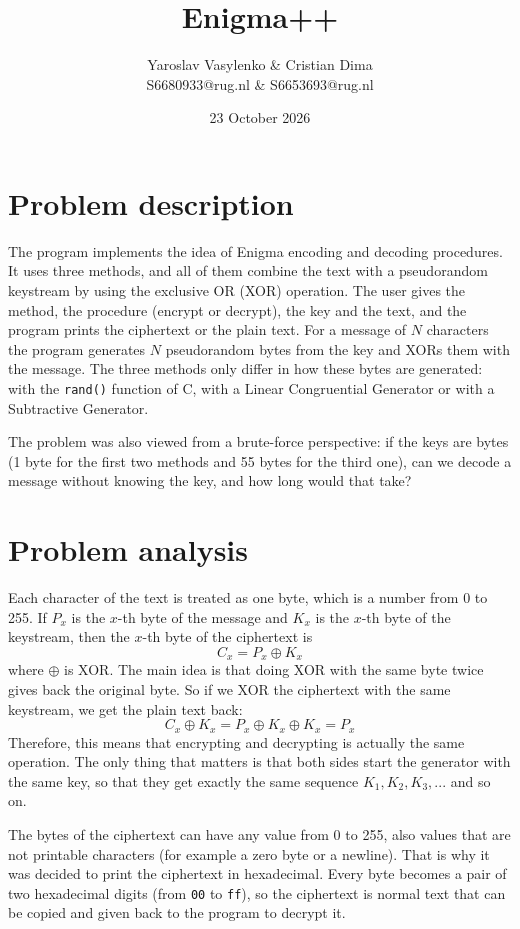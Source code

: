 \documentclass[a4paper,10pt]{article}
\title{Enigma++}
\author{Yaroslav Vasylenko \& Cristian Dima\\
        S6680933@rug.nl \& S6653693@rug.nl}
\date{23 October 2026}
\begin{document}
\maketitle
 
\section{Problem description}
The program implements the idea of Enigma encoding and decoding procedures. It uses three methods, and all of them combine the text with a pseudorandom keystream by using the exclusive OR (XOR) operation.
The user gives the method, the procedure (encrypt or decrypt), the key and the text, and the program prints the ciphertext or the plain text.
For a message of $N$ characters the program generates $N$ pseudorandom bytes from the key and XORs them with the message.
The three methods only differ in how these bytes are generated: with the {\tt rand()} function of C, with a Linear Congruential Generator or with a Subtractive Generator.
 
The problem was also viewed from a brute-force perspective: if the keys are bytes (1 byte for the first two methods and 55 bytes for the third one), can we decode a message without knowing the key, and how long would that take?
 
\section{Problem analysis}
Each character of the text is treated as one byte, which is a number from 0 to 255.
If $P_x$ is the $x$-th byte of the message and $K_x$ is the $x$-th byte of the keystream, then the $x$-th byte of the ciphertext is
\begin{equation}\label{exprEncrypt}
C_x = P_x \oplus K_x
\end{equation}
where $\oplus$ is XOR. The main idea is that doing XOR with the same byte twice gives back the original byte. So if we XOR the ciphertext with the same keystream, we get the plain text back:
\begin{equation}\label{exprDecrypt}
C_x \oplus K_x = P_x \oplus K_x \oplus K_x = P_x
\end{equation}
Therefore, this means that encrypting and decrypting is actually the same operation. The only thing that matters is that both sides start the generator with the same key, so that they get exactly the same sequence $K_1, K_2, K_3,...$ and so on.
 
The bytes of the ciphertext can have any value from 0 to 255, also values that are not printable characters (for example a zero byte or a newline). That is why it was decided to print the ciphertext in hexadecimal. Every byte becomes a pair of two hexadecimal digits (from {\tt 00} to {\tt ff}), so the ciphertext is normal text that can be copied and given back to the program to decrypt it.
 
\end{document}
